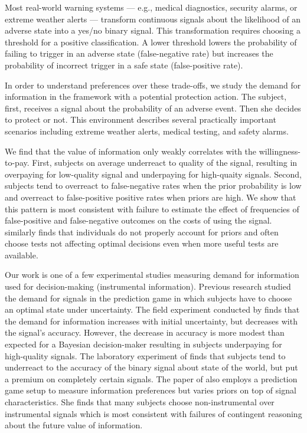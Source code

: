 \documentclass[12pt,a4paper]{article}
\begin{document}
Most real-world warning systems --- e.g., medical diagnostics, security alarms, or extreme weather alerts --- transform continuous signals about the likelihood of an adverse state into a yes/no binary signal. This transformation requires choosing a threshold for a positive classification. A lower threshold lowers the probability of failing to trigger in an adverse state (false-negative rate) but increases the probability of incorrect trigger in a safe state (false-positive rate). 

In order to understand preferences over these trade-offs, we study the demand for information in the framework with a potential protection action. The subject, first, receives a signal about the probability of an adverse event. Then she decides to protect or not. This environment describes several practically important scenarios including extreme weather alerts, medical testing, and safety alarms. 

We find that the value of information only weakly correlates with the willingness-to-pay. First, subjects on average underreact to quality of the signal, resulting in overpaying for low-quality signal and underpaying for high-quaity signals. Second, subjects tend to overreact to false-negative rates when the prior probability is low and overreact to false-positive positive rates when priors are high. We show that this pattern is most consistent with failure to estimate the effect of frequencies of false-positive and false-negative outcomes on the costs of using the signal. \citep{xu_revealed_2022} similarly finds that individuals do not properly account for priors and often choose tests not affecting optimal decisions even when more useful tests are available.

Our work is one of a few experimental studies measuring demand for information used for decision-making (instrumental information). Previous research studied the demand for signals in the prediction game in which subjects have to choose an optimal state under uncertainty. The field experiment conducted by \citep{hoffman_how_2016} finds that the demand for information increases with initial uncertainty, but decreases with the signal's accuracy. However, the decrease in accuracy is more modest than expected for a Bayesian decision-maker resulting in subjects underpaying for high-quality signals. The laboratory experiment of \citet{ambuehl_belief_2018} finds that subjects tend to underreact to the accuracy of the binary signal about state of the world, but put a premium on completely certain signals. The paper of \citet{xu_revealed_2022} also employs a prediction game setup to measure information preferences but varies priors on top of signal characteristics. She finds that many subjects choose non-instrumental over instrumental signals which is most consistent with failures of contingent reasoning about the future value of information.
\end{document}
